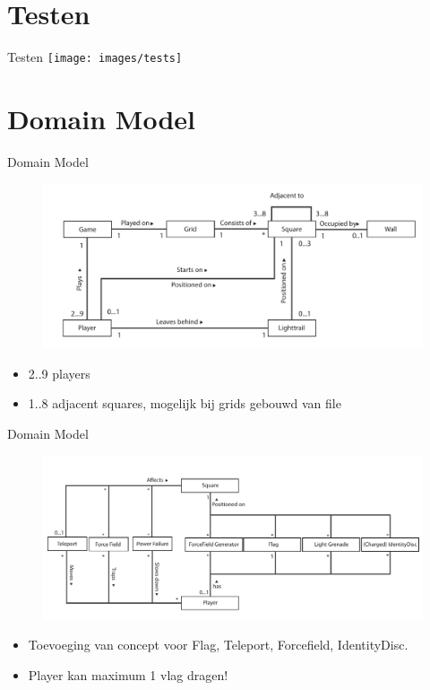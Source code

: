 \documentclass[11pt,t]{beamer}
\begin{document}
\section{Testen}

\begin{frame}{Testen}
\texttt{[image: images/tests]}
\end{frame}

\section{Domain Model}



\begin{frame}{Domain Model}

\begin{center}
\begin{figure}
\includegraphics[width=0.9\linewidth]{images/domainmodel2}
\end{figure}
\end{center}
\begin{itemize}
\item 2..9 players
\item 1..8 adjacent squares, mogelijk bij grids gebouwd van file
\end{itemize}
\end{frame}

\begin{frame}{Domain Model}
\begin{center}
\begin{figure}
\includegraphics[width=0.9\linewidth]{images/domainmodel1}
\end{figure}
\end{center}
\begin{itemize}
\item Toevoeging van concept voor Flag, Teleport, Forcefield, IdentityDisc.
\item Player kan maximum 1 vlag dragen!
\end{itemize}


\end{frame}
\end{document}
